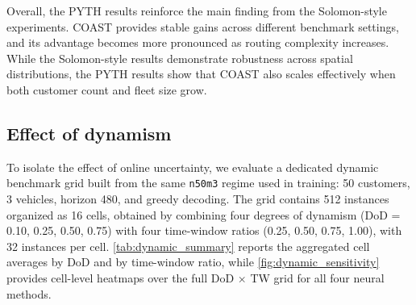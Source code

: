\documentclass[conference]{IEEEtran}
\begin{document}
Overall, the PYTH results reinforce the main finding from the Solomon-style experiments. COAST provides stable gains across different benchmark settings, and its advantage becomes more pronounced as routing complexity increases. While the Solomon-style results demonstrate robustness across spatial distributions, the PYTH results show that COAST also scales effectively when both customer count and fleet size grow.

\begin{table}[t]
\centering
\caption{PYTH benchmark results. Values are mean normalized cost $\pm$ standard deviation.}
\label{tab:pyth_benchmark}
\scriptsize
{}
\end{table}

\subsection{Effect of dynamism}

To isolate the effect of online uncertainty, we evaluate a dedicated dynamic benchmark grid built from the same \texttt{n50m3} regime used in training: 50 customers, 3 vehicles, horizon 480, and greedy decoding. The grid contains 512 instances organized as 16 cells, obtained by combining four degrees of dynamism (DoD = 0.10, 0.25, 0.50, 0.75) with four time-window ratios (0.25, 0.50, 0.75, 1.00), with 32 instances per cell. \autoref{tab:dynamic_summary} reports the aggregated cell averages by DoD and by time-window ratio, while \autoref{fig:dynamic_sensitivity} provides cell-level heatmaps over the full DoD $\times$ TW grid for all four neural methods.
\end{document}
